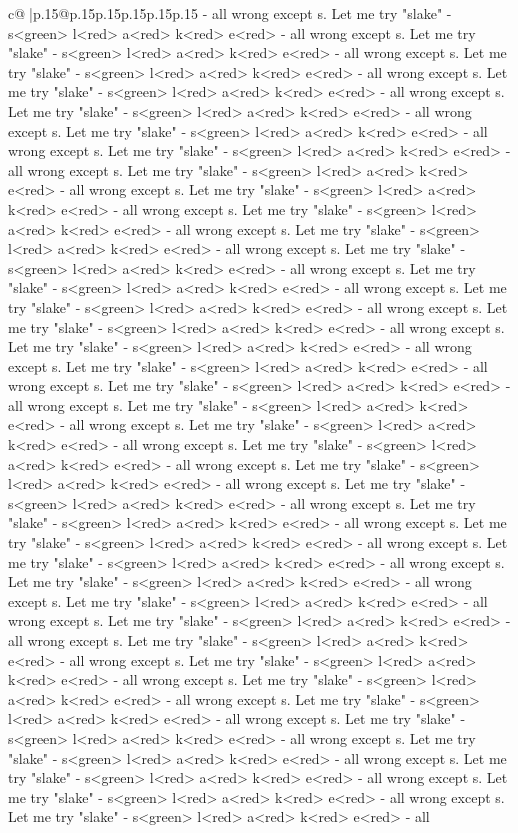 \documentclass{article}
\begin{document}
{\begin{supertabular}{c@{$\;$}|p{.15\linewidth}@{}p{.15\linewidth}p{.15\linewidth}p{.15\linewidth}p{.15\linewidth}p{.15\linewidth}}
{{{{-} all wrong except s. Let me try "slake" {-} s<green> l<red> a<red> k<red> e<red> {-} all wrong except s. Let me try "slake" {-} s<green> l<red> a<red> k<red> e<red> {-} all wrong except s. Let me try "slake" {-} s<green> l<red> a<red> k<red> e<red> {-} all wrong except s. Let me try "slake" {-} s<green> l<red> a<red> k<red> e<red> {-} all wrong except s. Let me try "slake" {-} s<green> l<red> a<red> k<red> e<red> {-} all wrong except s. Let me try "slake" {-} s<green> l<red> a<red> k<red> e<red> {-} all wrong except s. Let me try "slake" {-} s<green> l<red> a<red> k<red> e<red> {-} all wrong except s. Let me try "slake" {-} s<green> l<red> a<red> k<red> e<red> {-} all wrong except s. Let me try "slake" {-} s<green> l<red> a<red> k<red> e<red> {-} all wrong except s. Let me try "slake" {-} s<green> l<red> a<red> k<red> e<red> {-} all wrong except s. Let me try "slake" {-} s<green> l<red> a<red> k<red> e<red> {-} all wrong except s. Let me try "slake" {-} s<green> l<red> a<red> k<red> e<red> {-} all wrong except s. Let me try "slake" {-} s<green> l<red> a<red> k<red> e<red> {-} all wrong except s. Let me try "slake" {-} s<green> l<red> a<red> k<red> e<red> {-} all wrong except s. Let me try "slake" {-} s<green> l<red> a<red> k<red> e<red> {-} all wrong except s. Let me try "slake" {-} s<green> l<red> a<red> k<red> e<red> {-} all wrong except s. Let me try "slake" {-} s<green> l<red> a<red> k<red> e<red> {-} all wrong except s. Let me try "slake" {-} s<green> l<red> a<red> k<red> e<red> {-} all wrong except s. Let me try "slake" {-} s<green> l<red> a<red> k<red> e<red> {-} all wrong except s. Let me try "slake" {-} s<green> l<red> a<red> k<red> e<red> {-} all wrong except s. Let me try "slake" {-} s<green> l<red> a<red> k<red> e<red> {-} all wrong except s. Let me try "slake" {-} s<green> l<red> a<red> k<red> e<red> {-} all wrong except s. Let me try "slake" {-} s<green> l<red> a<red> k<red> e<red> {-} all wrong except s. Let me try "slake" {-} s<green> l<red> a<red> k<red> e<red> {-} all wrong except s. Let me try "slake" {-} s<green> l<red> a<red> k<red> e<red> {-} all wrong except s. Let me try "slake" {-} s<green> l<red> a<red> k<red> e<red> {-} all wrong except s. Let me try "slake" {-} s<green> l<red> a<red> k<red> e<red> {-} all wrong except s. Let me try "slake" {-} s<green> l<red> a<red> k<red> e<red> {-} all wrong except s. Let me try "slake" {-} s<green> l<red> a<red> k<red> e<red> {-} all wrong except s. Let me try "slake" {-} s<green> l<red> a<red> k<red> e<red> {-} all wrong except s. Let me try "slake" {-} s<green> l<red> a<red> k<red> e<red> {-} all wrong except s. Let me try "slake" {-} s<green> l<red> a<red> k<red> e<red> {-} all wrong except s. Let me try "slake" {-} s<green> l<red> a<red> k<red> e<red> {-} all wrong except s. Let me try "slake" {-} s<green> l<red> a<red> k<red> e<red> {-} all wrong except s. Let me try "slake" {-} s<green> l<red> a<red> k<red> e<red> {-} all wrong except s. Let me try "slake" {-} s<green> l<red> a<red> k<red> e<red> {-} all wrong except s. Let me try "slake" {-} s<green> l<red> a<red> k<red> e<red> {-} all wrong except s. Let me try "slake" {-} s<green> l<red> a<red> k<red> e<red> {-} all }}}
\end{supertabular}}
\end{document}
